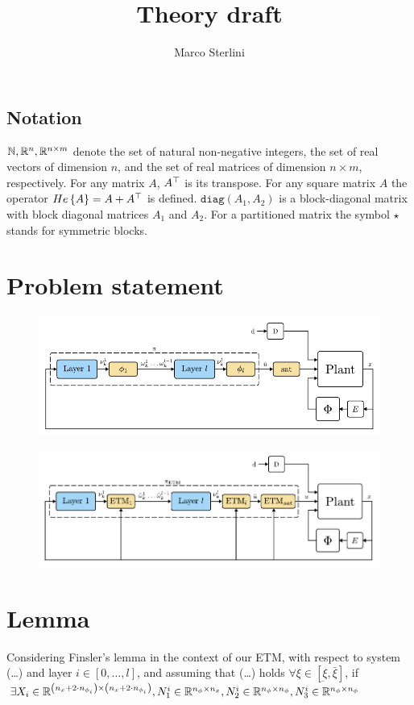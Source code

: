 \documentclass{article}
\begin{document}
\date{}
\author{Marco Sterlini}

\title{Theory draft}
\maketitle

\subsection*{\textbf{Notation}}
${\mathbb{N}}, {\mathbb{R}}^{n}, {\mathbb{R}}^{n \times m}$ denote the set of natural non-negative integers, the set of real vectors of dimension $n$, and the set of real matrices of dimension $n \times m$, respectively. For any matrix $A$, $A^\top$ is its transpose. For any square matrix $A$ the operator $He\left\{ A \right\} = A + A^\top$ is defined. $\texttt{diag}(A_1, A_2)$ is a block-diagonal matrix with block diagonal matrices $A_1$ and $A_2$. For a partitioned matrix the symbol $\star$ stands for symmetric blocks.

\section*{Problem statement}

\begin{figure}[H]
    \centering
    \includegraphics[width=\textwidth]{img/first_scheme}
    \caption{}
    \label{}
\end{figure}

\begin{figure}[H]
    \centering
    \includegraphics[width=\textwidth]{img/second_scheme}
    \caption{}
    \label{}
\end{figure}

\section*{\textbf{Lemma}}
Considering Finsler's lemma in the context of our ETM, with respect to system (\dots) and layer $i \in \left[ 0, \dots, l \right]$, and assuming that (\dots) holds $\forall \xi \in \left[ \underbar{\xi},  \bar{\xi} \right]$, if $\exists X_i \in {\mathbb{R}}^{\left( n_x + 2 \cdot n_{\phi_i} \right) \times\left( n_x + 2 \cdot n_{\phi_i} \right)}, N_{1}^{i} \in {\mathbb{R}}^{n_{\phi} \times n_x}, N_2^i \in {\mathbb{R}}^{n_{\phi} \times n_{\phi}}, N_3^i \in {\mathbb{R}}^{n_{\phi} \times n_{\phi}}$
\end{document}
